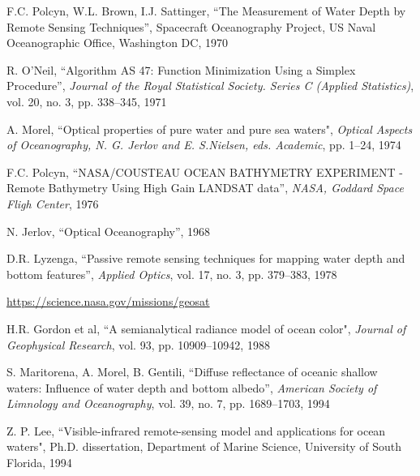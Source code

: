 

\begin{thebibliography}{99}

 F.C. Polcyn, W.L. Brown, I.J. Sattinger, ``The Measurement of Water Depth by Remote Sensing Techniques'', Spacecraft Oceanography Project, US Naval Oceanographic Office, Washington DC, 1970

 R. O'Neil, ``Algorithm AS 47: Function Minimization Using a Simplex Procedure'', \textit{Journal of the Royal Statistical Society. Series C (Applied Statistics)}, 
vol. 20, no. 3, pp. 338--345, 1971

 A. Morel, ``Optical properties of pure water and pure sea waters", \textit{Optical Aspects of Oceanography, N. G. Jerlov and E. S.Nielsen, eds. Academic}, pp. 1--24, 1974


 F.C. Polcyn, ``NASA/COUSTEAU OCEAN BATHYMETRY EXPERIMENT - Remote Bathymetry Using High Gain LANDSAT data'', \textit{NASA, Goddard Space Fligh Center}, 1976

 N. Jerlov, ``Optical Oceanography'', 1968

 D.R. Lyzenga, ``Passive remote sensing techniques for mapping water depth and bottom features'', \textit{Applied Optics}, vol. 17, no. 3, pp. 379--383, 1978


 \url{https://science.nasa.gov/missions/geosat}

 H.R. Gordon et al, ``A semianalytical radiance model of ocean color", \textit{Journal of Geophysical Research}, vol. 93, pp. 10909--10942, 1988

 S. Maritorena, A. Morel, B. Gentili, ``Diffuse reflectance of oceanic shallow waters: Influence of water depth and bottom albedo'', \textit{American Society of Limnology and Oceanography}, vol. 39, no. 7, pp. 1689--1703, 1994

 Z. P. Lee, ``Visible-infrared remote-sensing model and applications for ocean waters", Ph.D. dissertation, Department of Marine Science, University of South Florida, 1994


\end{thebibliography}
